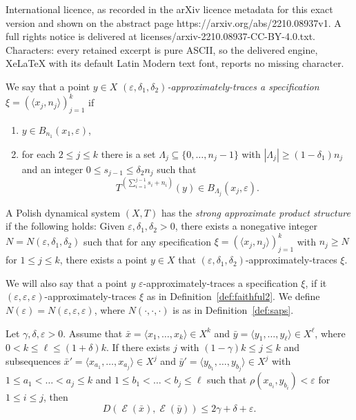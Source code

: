 \documentclass[10pt,a4paper]{amsart}
\DeclareMathOperator{\Emp}{\mathcal{E}}%
\newcommand{\eps}{\varepsilon}
\begin{document}
International licence, as recorded in the arXiv licence metadata for this exact version and shown on the abstract page https://arxiv.org/abs/2210.08937v1. A full rights notice is delivered at licenses/arxiv-2210.08937-CC-BY-4.0.txt. Characters: every retained excerpt is pure ASCII, so the delivered engine, XeLaTeX with its default Latin Modern text font, reports no missing character.
\begin{defn}\label{def:faithful2}
We say that a point $y\in X$ \emph{$(\eps,\delta_1,\delta_2)$-approximately-traces a specification $\xi=(\langle x_j,n_j\rangle)_{j=1}^k$} if
\begin{enumerate}
\item $y\in B_{n_1}(x_1,\eps)$,
\item for each $2\le j \le k$ there is a set $\Lambda_{j}\subseteq \{0,\ldots,n_{j}-1\}$
with $|\Lambda_{j}|\ge (1 - \delta_1) n_{j} $ and an
integer $0\le s_{j-1}\le \delta_2 n_{j}$ such that
\[
T^{(\sum_{i=1}^{j-1}s_i+n_i)}(y)\in B_{\Lambda_j}(x_j,\eps).
\]
\end{enumerate}
\end{defn}

\begin{defn} \label{def:saps}
A Polish dynamical system $(X, T )$ has the \emph{strong approximate product
structure} if the following holds: Given $\eps, \delta_1, \delta_2 > 0$,
there exists a nonegative integer $N=N(\eps,\delta_1,\delta_2)$
such that for any specification $\xi=(\langle x_j,n_j\rangle)_{j=1}^k$ with $n_j \ge N$ for $1 \le j \le k$,
there exists a point $y \in X$ that $(\eps,\delta_1,\delta_2)$-approximately-traces $\xi$.
\end{defn}

\begin{rem}\label{rem:N}
We will also say that a point $y$ $\eps$-approximately-traces a specification $\xi$, if it $(\eps, \eps, \eps)$-approximately-traces $\xi$ as in Definition~\ref{def:faithful2}. We define $N(\eps) = N(\eps, \eps, \eps)$, where $N(\cdot,\cdot,\cdot)$ is as in Definition~\ref{def:saps}. %
\end{rem}

\begin{lem}\label{lem:close-segments}
Let $\gamma,\delta,\eps>0$. Assume that
$\bar x=\langle x_1,\ldots,x_k\rangle\in X^k$ and
$\bar y=\langle y_1,\ldots,y_\ell\rangle\in X^\ell$, where $0<k\le \ell\le (1+\delta)k$.
If there exists $j$ with $(1-\gamma)k\le j\le k$ and
subsequences $\bar x'=\langle x_{a_1},\ldots,x_{a_j}\rangle\in X^j$ and
$\bar y'=\langle y_{b_1},\ldots,y_{b_j}\rangle\in X^j$ with $1\le a_1 <\ldots < a_j\le k$
and $1\le b_1 <\ldots < b_j\le \ell$
such that $\rho(x_{a_i},y_{b_i})<\eps$ for $1\le i\le j$, then
\[
D(\Emp(\bar x),\Emp(\bar y))
\le 2\gamma+\delta+\eps.
\]
\end{lem}
\end{document}
